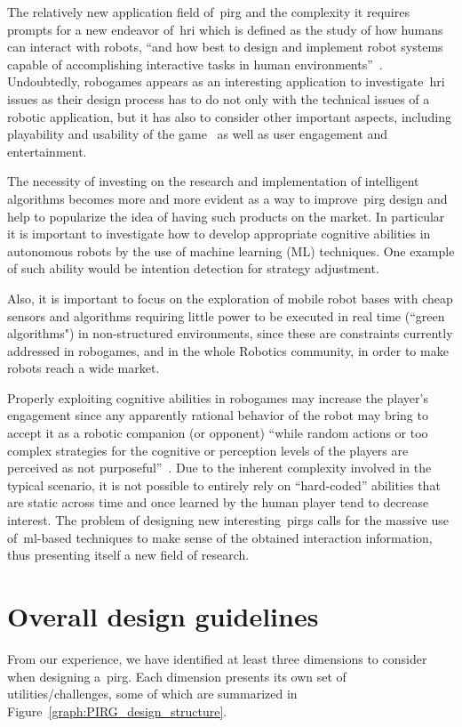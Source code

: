 The relatively new application field of~\gls{pirg} and the complexity it requires prompts for a new endeavor of~\gls{hri} which is defined as the study of how humans can interact with robots, ``and how best to design and implement robot systems capable of accomplishing interactive tasks in human environments''~\citep{feil-seifer_human_2009}. Undoubtedly, robogames appears as an interesting application to investigate~\gls{hri} issues as their design process has to do not only with the technical issues of a robotic application, but it has also to consider other important aspects, including playability and usability of the game~\citep{martinoia_physically_2013} as well as user engagement and entertainment.

The necessity of investing on the research and implementation of intelligent algorithms becomes more and more evident as a way to improve~\gls{pirg} design and help to popularize the idea of having such products on the market. In particular it is important to investigate how to develop appropriate cognitive abilities in autonomous robots by the use of machine learning (ML) techniques. One example of such ability would be  intention detection for strategy adjustment. 

Also, it is important to focus on the exploration of mobile robot bases with cheap sensors and algorithms requiring little power to be executed in real time (``green algorithms") in non-structured environments, since these are constraints currently addressed in robogames, and in the whole Robotics community, in order to make robots reach a wide market. 

Properly exploiting cognitive abilities in robogames may increase the player's engagement since any apparently rational behavior of the robot may bring to accept it as a robotic companion (or opponent) ``while random actions or too complex strategies for the cognitive or perception levels of the players are perceived as not purposeful''~\citep{martinoia_physically_2013}. Due to the inherent complexity involved in the typical scenario, it is not possible to entirely rely on ``hard-coded'' abilities that are static across time and once learned by the human player tend to decrease interest. The problem of designing new interesting~\glspl{pirg} calls for the massive use of~\gls{ml}-based techniques to make sense of the obtained interaction information, thus presenting itself a new field of research.

\section{Overall design guidelines}\label{sec:dimensions}
From our experience, we have identified at least three dimensions to consider when designing a~\gls{pirg}. Each dimension presents its own set of utilities/challenges, some of which are summarized in Figure~\ref{graph:PIRG_design_structure}. 


